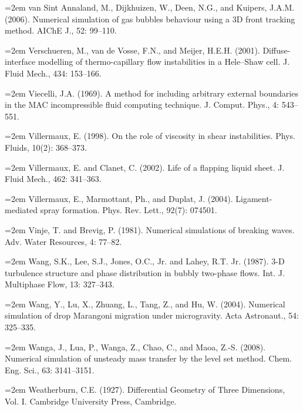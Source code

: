 \documentclass[11pt,a4paper,openany,fontset=none]{ctexbook}
\begin{document}
\par\hangindent=2em van Sint Annaland, M., Dijkhuizen, W., Deen, N.G., and Kuipers, J.A.M. (2006). Numerical simulation of gas bubbles behaviour using a 3D front tracking method. AIChE J., 52: 99--110.

\par\hangindent=2em Verschueren, M., van de Vosse, F.N., and Meijer, H.E.H. (2001). Diffuse-interface modelling of thermo-capillary flow instabilities in a Hele--Shaw cell. J. Fluid Mech., 434: 153--166.

\par\hangindent=2em Viecelli, J.A. (1969). A method for including arbitrary external boundaries in the MAC incompressible fluid computing technique. J. Comput. Phys., 4: 543--551.

\par\hangindent=2em Villermaux, E. (1998). On the role of viscosity in shear instabilities. Phys. Fluids, 10(2): 368--373.

\par\hangindent=2em Villermaux, E. and Clanet, C. (2002). Life of a flapping liquid sheet. J. Fluid Mech., 462: 341--363.

\par\hangindent=2em Villermaux, E., Marmottant, Ph., and Duplat, J. (2004). Ligament-mediated spray formation. Phys. Rev. Lett., 92(7): 074501.

\par\hangindent=2em Vinje, T. and Brevig, P. (1981). Numerical simulations of breaking waves. Adv. Water Resources, 4: 77--82.

\par\hangindent=2em Wang, S.K., Lee, S.J., Jones, O.C., Jr. and Lahey, R.T. Jr. (1987). 3-D turbulence structure and phase distribution in bubbly two-phase flows. Int. J. Multiphase Flow, 13: 327--343.

\par\hangindent=2em Wang, Y., Lu, X., Zhuang, L., Tang, Z., and Hu, W. (2004). Numerical simulation of drop Marangoni migration under microgravity. Acta Astronaut., 54: 325--335.


\par\hangindent=2em Wanga, J., Lua, P., Wanga, Z., Chao, C., and Maoa, Z.-S. (2008). Numerical simulation of unsteady mass transfer by the level set method. Chem. Eng. Sci., 63: 3141--3151.

\par\hangindent=2em Weatherburn, C.E. (1927). Differential Geometry of Three Dimensions, Vol. I. Cambridge University Press, Cambridge.
\end{document}
